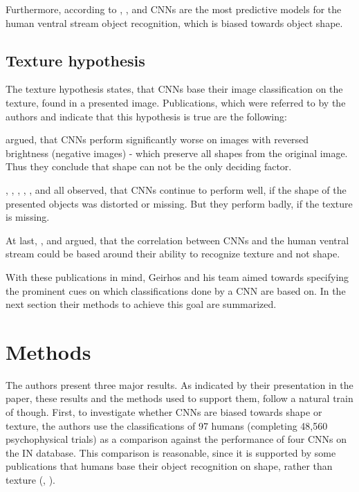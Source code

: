 \documentclass[runningheads,a4paper]{llncs}
\begin{document}
Furthermore, according to \citet{ritter2017cognitive}, \citet{cadieu2014deep}, \citet{yamins2014performance} and \citet{landau1988importance} CNNs are the most predictive models for the human ventral stream object recognition, which is biased towards object shape.

\subsection{Texture hypothesis}
The texture hypothesis states, that CNNs base their image classification on the texture, found in a presented image.  Publications, which were referred to by the authors and indicate that this hypothesis is true are the following:

\citet{hosseini2018assessing} argued, that CNNs perform significantly worse on images with reversed brightness (negative images) - which preserve all shapes from the original image. Thus they conclude that shape can not be the only deciding factor.

\citet{gatys2015texture}, \citet{gatys2017controlling}, \citet{brendel2019approximating}, \citet{ballester2016performance}, \citet{funke2017synthesising}, \citet{ballester2016performance} and  \citet{eckstein2017beyond} all observed, that CNNs continue to perform well, if the shape of the presented objects was distorted or missing. But they perform badly, if the texture is missing.

At last, \citet{wallis2017parametric}, \citet{laskar2018correspondence} and \citet{long2018role} argued, that the correlation between CNNs and the human ventral stream could be based around their ability to recognize texture and not shape.

With these publications in mind, Geirhos and his team aimed towards specifying the prominent cues on which classifications done by a CNN are based on. In the next section their methods to achieve this goal are summarized.

\section{Methods}
The authors present three major results. As indicated by their presentation in the paper, these results and the methods used to support them, follow a natural train of though. First, to investigate whether CNNs are biased towards shape or texture, the authors use the classifications of 97 humans (completing 48,560 psychophysical trials) as a comparison against the performance of four CNNs on the IN database. This comparison is reasonable, since it is supported by some publications that humans base their object recognition on shape, rather than texture (\cite{ritter2017cognitive}, \cite{landau1988importance}).
\end{document}
